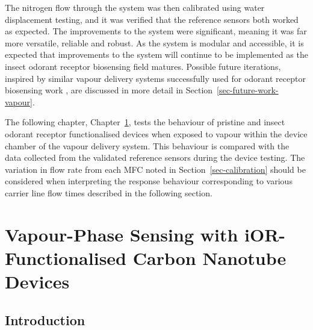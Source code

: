 \documentclass[
  a4paper,
]{scrbook}
\begin{document}
The nitrogen flow through the system was then calibrated using water
displacement testing, and it was verified that the reference sensors
both worked as expected. The improvements to the system were
significant, meaning it was far more versatile, reliable and robust. As
the system is modular and accessible, it is expected that improvements
to the system will continue to be implemented as the insect odorant
receptor biosensing field matures. Possible future iterations, inspired
by similar vapour delivery systems successfully used for odorant
receptor biosensing work \autocite{Terutsuki2020,Hirata2021}, are
discussed in more detail in Section~\ref{sec-future-work-vapour}.

The following chapter, Chapter~\ref{sec-vapour-biosensing-iORs}, tests
the behaviour of pristine and insect odorant receptor functionalised
devices when exposed to vapour within the device chamber of the vapour
delivery system. This behaviour is compared with the data collected from
the validated reference sensors during the device testing. The variation
in flow rate from each MFC noted in Section~\ref{sec-calibration} should
be considered when interpreting the response behaviour corresponding to
various carrier line flow times described in the following section.


\hypertarget{sec-vapour-biosensing-iORs}{%
\chapter{Vapour-Phase Sensing with iOR-Functionalised Carbon Nanotube
Devices}\label{sec-vapour-biosensing-iORs}}

\hypertarget{introduction-6}{%
\section{Introduction}\label{introduction-6}}
\end{document}
